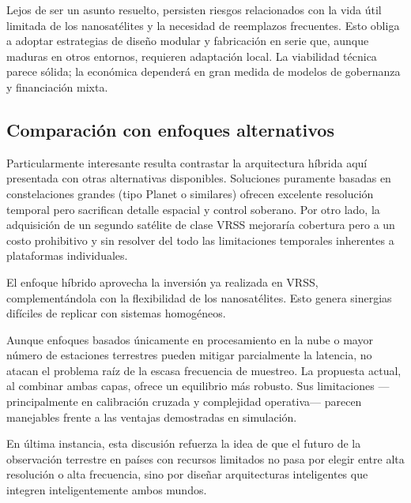Lejos de ser un asunto resuelto, persisten riesgos relacionados con la vida útil limitada de los nanosatélites y la necesidad de reemplazos frecuentes. Esto obliga a adoptar estrategias de diseño modular y fabricación en serie que, aunque maduras en otros entornos, requieren adaptación local. La viabilidad técnica parece sólida; la económica dependerá en gran medida de modelos de gobernanza y financiación mixta.

\subsection{Comparación con enfoques alternativos}

Particularmente interesante resulta contrastar la arquitectura híbrida aquí presentada con otras alternativas disponibles. Soluciones puramente basadas en constelaciones grandes (tipo Planet o similares) ofrecen excelente resolución temporal pero sacrifican detalle espacial y control soberano. Por otro lado, la adquisición de un segundo satélite de clase VRSS mejoraría cobertura pero a un costo prohibitivo y sin resolver del todo las limitaciones temporales inherentes a plataformas individuales.

El enfoque híbrido aprovecha la inversión ya realizada en VRSS, complementándola con la flexibilidad de los nanosatélites. Esto genera sinergias difíciles de replicar con sistemas homogéneos. 

Aunque enfoques basados únicamente en procesamiento en la nube o mayor número de estaciones terrestres pueden mitigar parcialmente la latencia, no atacan el problema raíz de la escasa frecuencia de muestreo. La propuesta actual, al combinar ambas capas, ofrece un equilibrio más robusto. Sus limitaciones —principalmente en calibración cruzada y complejidad operativa— parecen manejables frente a las ventajas demostradas en simulación.

En última instancia, esta discusión refuerza la idea de que el futuro de la observación terrestre en países con recursos limitados no pasa por elegir entre alta resolución o alta frecuencia, sino por diseñar arquitecturas inteligentes que integren inteligentemente ambos mundos.